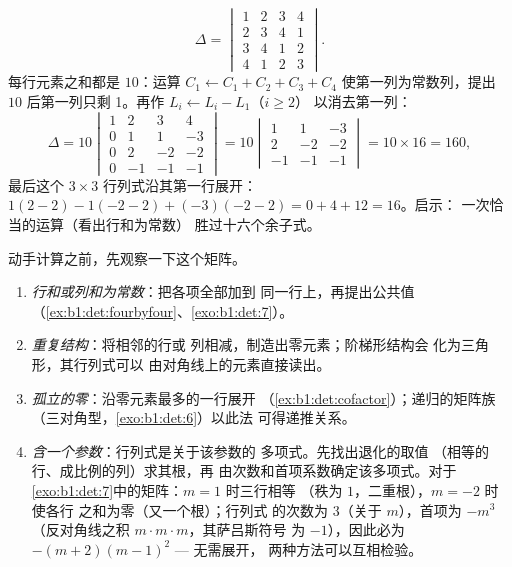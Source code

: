 \begin{example}
\label{ex:b1:det:fourbyfour}
\[
\Delta = \begin{vmatrix}
1 & 2 & 3 & 4\\
2 & 3 & 4 & 1\\
3 & 4 & 1 & 2\\
4 & 1 & 2 & 3
\end{vmatrix}.
\]
每行元素之和都是 $10$：运算 $C_1 \leftarrow C_1 + C_2 +
C_3 + C_4$ 使第一列为常数列，提出 $10$
后第一列只剩 1。再作 $L_i \leftarrow L_i - L_1$（$i \geq 2$）
以消去第一列：
\[
\Delta = 10\begin{vmatrix}
1 & 2 & 3 & 4\\
0 & 1 & 1 & -3\\
0 & 2 & -2 & -2\\
0 & -1 & -1 & -1
\end{vmatrix}
= 10\begin{vmatrix}
1 & 1 & -3\\
2 & -2 & -2\\
-1 & -1 & -1
\end{vmatrix}
= 10 \times 16 = 160,
\]
最后这个 $3\times3$ 行列式沿其第一行展开：
$1(2 - 2) - 1(-2 - 2) + (-3)(-2 - 2) = 0 + 4 + 12 = 16$。启示：
一次恰当的运算（看出行和为常数）
胜过十六个余子式。
\end{example}

\begin{method}[选择行列式的计算策略]
\label{met:b1:det:strategy}
动手计算之前，先观察一下这个矩阵。
\begin{enumerate}
  \item \emph{行和或列和为常数}：把各项全部加到
        同一行上，再提出公共值
        （\cref{ex:b1:det:fourbyfour}、\cref{exo:b1:det:7}）。
  \item \emph{重复结构}：将相邻的行或
        列相减，制造出零元素；阶梯形结构会
        化为三角形，其行列式可以
        由对角线上的元素直接读出。
  \item \emph{孤立的零}：沿零元素最多的一行展开
        （\cref{ex:b1:det:cofactor}）；递归的矩阵族
        （三对角型，\cref{exo:b1:det:6}）以此法
        可得递推关系。
  \item \emph{含一个参数}：行列式是关于该参数的
        多项式。先找出退化的取值
        （相等的行、成比例的列）求其根，再
        由次数和首项系数确定该多项式。对于
        \cref{exo:b1:det:7}中的矩阵：$m = 1$ 时三行相等
        （秩为 $1$，二重根），$m = -2$ 时使各行
        之和为零（又一个根）；行列式
        的次数为 $3$（关于 $m$），首项为 $-m^3$
        （反对角线之积 $m\cdot m\cdot m$，其萨吕斯符号
        为 $-1$），因此必为 $-(m+2)(m-1)^2$ --- 无需展开，
        两种方法可以互相检验。
\end{enumerate}
\end{method}

